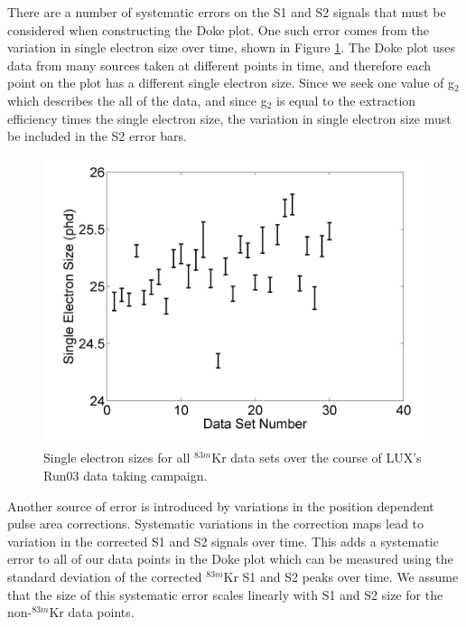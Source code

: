 \documentclass[a4paper,12pt]{article}
\begin{document}
{There are a number of systematic errors on the S1 and S2 signals that must be considered when constructing the Doke plot.  One such error comes from the variation in single electron size over time, shown in Figure \ref{SESizes}. The Doke plot uses data from many sources taken at different points in time, and therefore each point on the plot has a different single electron size.  Since we seek one value of g$_2$ which describes the all of the data, and since g$_2$ is equal to the extraction efficiency times the single electron size, the variation in single electron size must be included in the S2 error bars.

\begin{figure}[H]
\centering
\includegraphics[scale=0.4]{SESizes.png}
\caption{Single electron sizes for all $^{83m}$Kr data sets over the course of LUX's Run03 data taking campaign.}
\label{SESizes}
\end{figure}


Another source of error is introduced by variations in the position dependent pulse area corrections.  Systematic variations in the correction maps lead to variation in the corrected S1 and S2 signals over time.  This adds a systematic error to all of our data points in the Doke plot which can be measured using the standard deviation of the corrected $^{83m}$Kr S1 and S2 peaks over time.  We assume that the size of this systematic error scales linearly with S1 and S2 size for the non-$^{83m}$Kr data points. 

}
\end{document}
